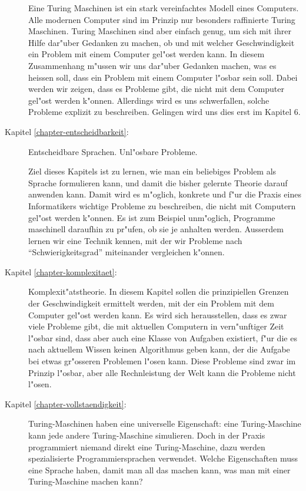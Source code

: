 \begin{description}
Eine Turing Maschinen ist ein stark vereinfachtes Modell eines Computers.
Alle modernen Computer sind im Prinzip nur besonders raffinierte Turing Maschinen.
Turing Maschinen sind aber einfach genug, um sich mit ihrer Hilfe dar"uber Gedanken
zu machen, ob und mit welcher Geschwindigkeit ein Problem mit einem
Computer gel"ost werden kann. In diesem Zusammenhang m"ussen wir uns
dar"uber Gedanken machen, was es heissen soll, dass ein Problem mit
einem Computer l"osbar sein soll. Dabei werden wir zeigen, dass es Probleme
gibt, die nicht mit dem Computer gel"ost werden k"onnen. Allerdings wird
es uns schwerfallen, solche Probleme explizit zu beschreiben. 
Gelingen wird uns dies erst im Kapitel 6.

\item[Kapitel \ref{chapter-entscheidbarkeit}:] Entscheidbare Sprachen. Unl"osbare Probleme.

Ziel dieses Kapitels ist zu lernen, wie man ein beliebiges Problem als
Sprache formulieren kann, und damit die bisher gelernte Theorie darauf
anwenden kann. Damit wird es m"oglich, konkrete und f"ur die Praxis eines
Informatikers wichtige Probleme zu beschreiben, die
nicht mit Computern gel"ost werden k"onnen.
Es ist zum Beispiel unm"oglich, Programme maschinell daraufhin
zu pr"ufen, ob sie je anhalten werden.
Ausserdem lernen wir eine Technik kennen, mit der wir Probleme 
nach ``Schwierigkeitsgrad'' miteinander vergleichen k"onnen. 

\item[Kapitel \ref{chapter-komplexitaet}:] Komplexit"atstheorie. In diesem Kapitel sollen 
die prinzipiellen Grenzen der Geschwindigkeit ermittelt werden,
mit der ein Problem mit dem Computer gel"ost werden kann. Es wird sich
herausstellen, dass es zwar viele Probleme gibt, die mit aktuellen Computern in
vern"unftiger Zeit l"osbar sind, dass aber auch eine Klasse von Aufgaben
existiert, f"ur die es nach aktuellem Wissen keinen Algorithmus geben kann,
der die Aufgabe bei etwas gr"osseren Problemen l"osen kann. Diese Probleme sind
zwar im Prinzip l"osbar, aber alle Rechnleistung der Welt kann die Probleme nicht l"osen.

\item[Kapitel \ref{chapter-vollstaendigkeit}:]
Turing-Maschinen haben eine universelle Eigenschaft: eine Turing-Maschine
kann jede andere Turing-Maschine simulieren. Doch in der Praxis
programmiert niemand direkt eine Turing-Maschine, dazu werden
spezialisierte Programmiersprachen verwendet.
Welche Eigenschaften muss eine Sprache haben, damit
man all das machen kann, was man mit einer Turing-Maschine
machen kann?
\end{description}


